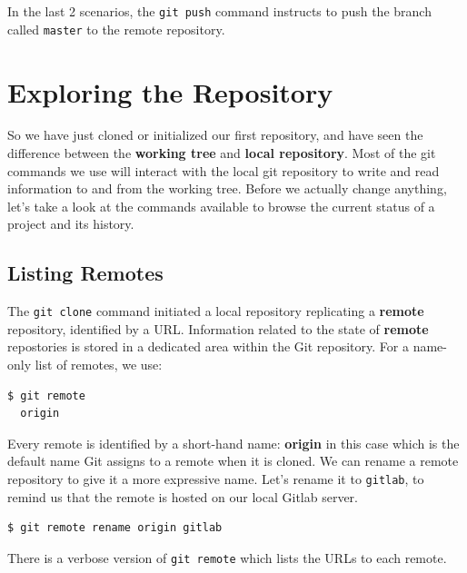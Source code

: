 \documentclass{../common/tufte-latex/tufte-handout}
\begin{document}
In  the last 2 scenarios, the \texttt{git push} command instructs to push the branch called \texttt{master} to the remote repository. 

\section{Exploring the Repository}

So we have just cloned or initialized our first repository, and have seen the difference between the \textbf{working tree} and \textbf{local repository}.
Most of the git commands we use will interact with the local git repository to write and read information to and from the working tree.
Before we actually change anything, let's take a look at the commands available to browse the current status of a project and its history.

\subsection{Listing Remotes}

The \texttt{git clone} command initiated a local repository replicating a \textbf{remote} repository, identified by a URL.
Information related to the state of \textbf{remote} repostories is stored in a dedicated area within the Git repository.
For a name-only list of remotes, we use:

\begin{lstlisting}[style=BashInputStyle]
  $ git remote
  origin
\end{lstlisting}

Every remote is identified by a short-hand name: \textbf{origin} in this case which is the default name Git assigns to a remote when it is cloned.
We can rename a remote repository to give it a more expressive name.
Let's rename it to \texttt{gitlab}, to remind us that the remote is hosted on our local Gitlab server.

\begin{lstlisting}[style=BashInputStyle]
  $ git remote rename origin gitlab
\end{lstlisting}


There is a verbose version of \texttt{git remote} which lists the URLs to each remote.
\end{document}
